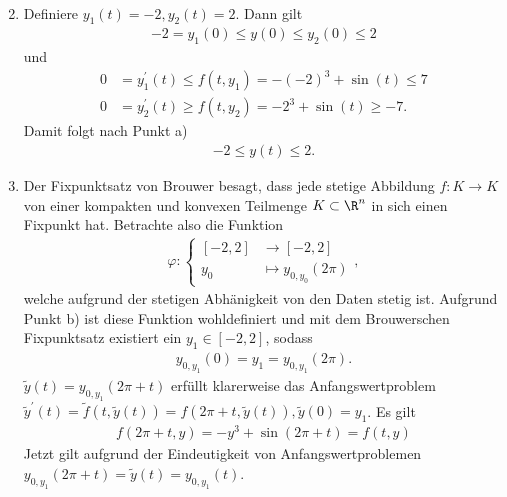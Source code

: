 \begin{solution}
\begin{enumerate}[label = \textbf{\alph*)}]
\begin{align*}
  \end{align*}
  \item Definiere $y_1(t) = -2, y_2(t) = 2$. Dann gilt
  \begin{align*}
    -2 = y_1(0) \leq y(0) \leq y_2(0) \leq 2
  \end{align*}
  und
  \begin{align*}
    0 &= y_1^{\prime}(t) \leq f(t,y_1) = -(-2)^3 + \sin(t) \leq 7 \\
    0 &= y_2^{\prime}(t) \geq f(t,y_2) = -2^3 + \sin(t) \geq -7.
  \end{align*}
  Damit folgt nach Punkt a)
  \begin{align*}
    -2 \leq y(t) \leq 2.
  \end{align*}
  \item Der Fixpunktsatz von Brouwer besagt, dass jede stetige Abbildung $f: K \to K$
  von einer kompakten und konvexen Teilmenge $K \subset \R^n$ in sich einen Fixpunkt hat.
  Betrachte also die Funktion
  \begin{align*}
    \varphi: \begin{cases}
      [-2,2] &\to [-2,2] \\
      y_0 &\mapsto y_{0,y_0}(2\pi)
    \end{cases},
  \end{align*}
  welche aufgrund der stetigen Abhänigkeit von den Daten stetig ist.
  Aufgrund Punkt b) ist diese Funktion wohldefiniert und mit dem Brouwerschen Fixpunktsatz
  existiert ein $y_1 \in [-2,2]$, sodass
  \begin{align*}
    y_{0,y_1}(0) = y_1 = y_{0,y_1}(2\pi).
  \end{align*}
  $\widetilde{y}(t) = y_{0,y_1}(2\pi + t)$ erfüllt klarerweise das Anfangswertproblem $\widetilde{y}^{\prime}(t) =
  \widetilde{f}(t,\widetilde{y}(t)) = f(2\pi+t,\widetilde{y}(t)),
  \widetilde{y}(0) = y_1$. Es gilt
  \begin{align*}
    f(2\pi + t,y) = -y^3 + \sin(2\pi + t) = f(t,y)
  \end{align*}
  Jetzt gilt aufgrund der Eindeutigkeit von Anfangswertproblemen
  $y_{0,y_1}(2\pi + t) = \widetilde{y}(t) = y_{0,y_1}(t)$.
\end{enumerate}
\end{solution}
